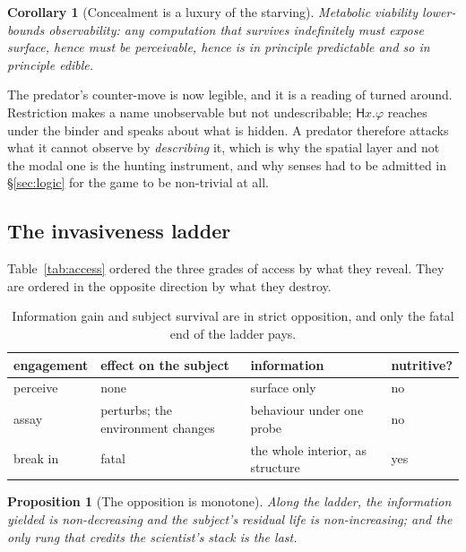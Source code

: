 \documentclass[11pt]{article}
\theoremstyle{plain}
\newtheorem{proposition}[theorem]{Proposition}
\newtheorem{corollary}[theorem]{Corollary}
\theoremstyle{definition}
\begin{document}
\begin{corollary}[Concealment is a luxury of the starving]
\label{cor:conceal}
Metabolic viability lower-bounds observability: any computation that survives indefinitely must expose
surface, hence must be perceivable, hence is in principle predictable and so in principle edible.
\end{corollary}

The predator's counter-move is now legible, and it is a reading of \cite[Rem.~2]{ClassifierNote}
turned around. Restriction makes a name unobservable but not undescribable; $\mathsf{H}x.\varphi$
reaches under the binder and speaks about what is hidden. A predator therefore attacks what it cannot
observe by \emph{describing} it, which is why the spatial layer and not the modal one is the hunting
instrument, and why senses had to be admitted in \S\ref{sec:logic} for the game to be non-trivial at
all.

\subsection{The invasiveness ladder}

Table~\ref{tab:access} ordered the three grades of access by what they reveal. They are ordered in the
opposite direction by what they destroy.

\begin{table}[h]
\centering
\begin{tabular}{@{}llll@{}}
\toprule
\textbf{engagement} & \textbf{effect on the subject} & \textbf{information} & \textbf{nutritive?} \\
\midrule
perceive & none & surface only & no \\
assay & perturbs; the environment changes & behaviour under one probe & no \\
break in & fatal & the whole interior, as structure & yes \\
\bottomrule
\end{tabular}
\caption{Information gain and subject survival are in strict opposition, and only the fatal end of the
ladder pays.}
\label{tab:ladder}
\end{table}

\begin{proposition}[The opposition is monotone]
Along the ladder, the information yielded is non-decreasing and the subject's residual life is
non-increasing; and the only rung that credits the scientist's stack is the last.
\end{proposition}
\end{document}
